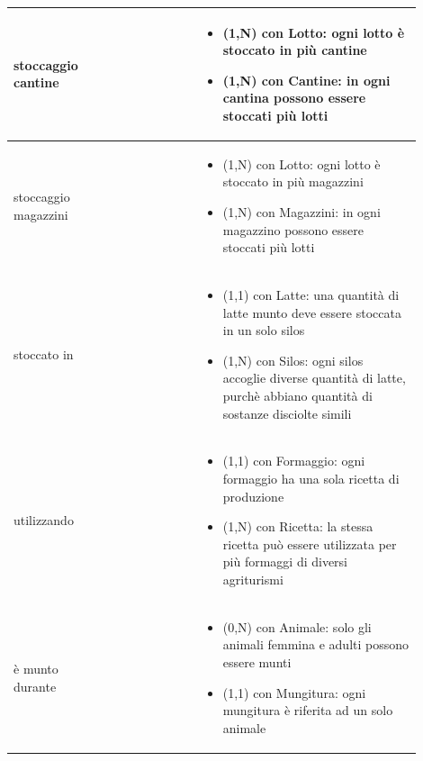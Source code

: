 \documentclass[12pt,a4paper]{article}
\begin{document}
\begin{center}
\begin{longtable}{|p{0.16\linewidth}|p{0.24\linewidth}|p{0.50\linewidth}|}
\hline
stoccaggio cantine 				&   
					& \begin{itemize}
						\setlength{\itemindent}{-1em}
						\vspace{-25pt}
						\setlength\itemsep{-0.25em}
						\item (1,N) con Lotto: ogni lotto è stoccato in più cantine
						\item (1,N) con Cantine: in ogni cantina possono essere stoccati più lotti
					\end{itemize}\\ 

\hline
stoccaggio magazzini 				&   
					& \begin{itemize}
						\setlength{\itemindent}{-1em}
						\vspace{-25pt}
						\setlength\itemsep{-0.25em}
						\item (1,N) con Lotto: ogni lotto è stoccato in più magazzini
						\item (1,N) con Magazzini: in ogni magazzino possono essere stoccati più lotti
					\end{itemize}\\ 

\hline
stoccato in 				&   
					& \begin{itemize}
						\setlength{\itemindent}{-1em}
						\vspace{-25pt}
						\setlength\itemsep{-0.25em}
						\item (1,1) con Latte: una quantità di latte munto deve essere stoccata in un solo silos
						\item (1,N) con Silos: ogni silos accoglie diverse quantità di latte, purchè abbiano quantità di sostanze disciolte simili
					\end{itemize}\\ 

\hline
utilizzando 				&   
					& \begin{itemize}
						\setlength{\itemindent}{-1em}
						\vspace{-25pt}
						\setlength\itemsep{-0.25em}
						\item (1,1) con Formaggio: ogni formaggio ha una sola ricetta di produzione
						\item (1,N) con Ricetta: la stessa ricetta può essere utilizzata per più formaggi di diversi agriturismi
					\end{itemize}\\ 

\hline
è munto durante 				&   
					& \begin{itemize}
						\setlength{\itemindent}{-1em}
						\vspace{-25pt}
						\setlength\itemsep{-0.25em}
						\item (0,N) con Animale: solo gli animali femmina e adulti possono essere munti
						\item (1,1) con Mungitura: ogni mungitura è riferita ad un solo animale
					\end{itemize}\\ 

\hline

\end{longtable}
\end{center}
\pagebreak
\end{document}
